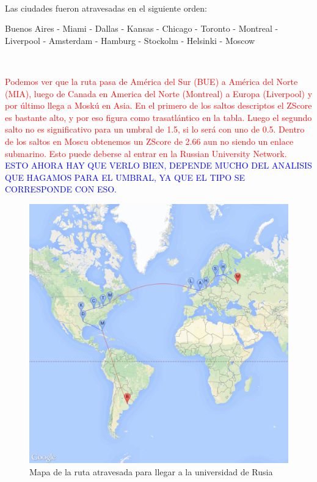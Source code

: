 ~

Las ciudades fueron atravesadas en el siguiente orden:

Buenos Aires - Miami - Dallas - Kansas - Chicago - Toronto - Montreal - Liverpool - Amsterdam -
Hamburg - Stockolm - Helsinki - Moscow

~

\textcolor{red}{Podemos ver que la ruta pasa de Am\'erica del Sur (BUE) a Am\'erica del Norte (MIA), luego de Canada en America del Norte (Montreal) a Europa (Liverpool) y por \'ultimo llega a Mosk\'u en Asia. En el primero de los saltos descriptos el ZScore es bastante alto, y por eso figura como trasatl\'antico en la tabla.
Luego el segundo salto no es significativo para un umbral de 1.5, si lo ser\'a con uno de 0.5.
Dentro de los saltos en Moscu obtenemos un ZScore de 2.66 aun no siendo un enlace submarino. Esto puede deberse al entrar en la Russian University Network.}
\textcolor{blue}{ESTO AHORA HAY QUE VERLO BIEN, DEPENDE MUCHO DEL ANALISIS QUE HAGAMOS PARA EL UMBRAL, YA QUE EL TIPO SE CORRESPONDE CON ESO.}

\begin{figure}[H]
	\begin{center}
		  \includegraphics[scale=0.25]{../results/maps/MSU.png}
		  \caption{Mapa de la ruta atravesada para llegar a la universidad de Rusia}
	\end{center}
\end{figure}

